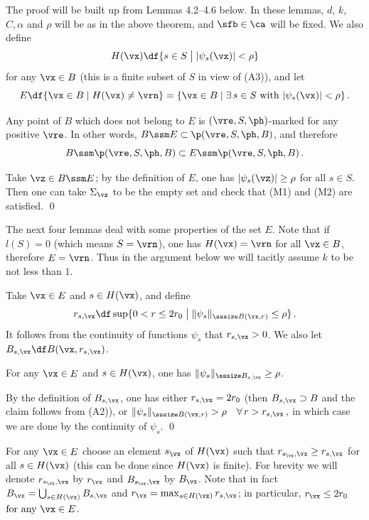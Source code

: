 The proof will be built up from Lemmas 4.2--4.6 below. In these lemmas,  $d$, $k$, $C,\alpha$ and $\rho$ will be as in the  above theorem, and   $\sfb\in\ca$ will be fixed. We also
 define 
$$
H(\vx)\df\{s\in S\bigm| |\psi_s(\vx)| < \rho \}
$$
for any  $\vx\in B$ (this is a finite subset of $S$ in view of (A3)), and let 
$$
E\df \{\vx\in B\mid H(\vx)\ne\vrn\} = \{\vx\in B\mid \exists\,s\in S\text{ with }|\psi_s(\vx)| < \rho \}\,.
$$


 Any point of $B$ which does not belong to $E$ is $(\vre,S,\ph)$-marked for any  positive $\vre$. In other words, 
$
B\ssm E \subset \p(\vre,S,\ph,B)
$, and therefore
$$
B\ssm \p(\vre,S,\ph,B)\subset E\ssm \p(\vre,S,\ph,B)\,.
$$
\endproclaim

 Take $\vz\in B\ssm E$; by the definition of $E$, one has $|\psi_s(\vz)| \ge \rho $ for all $s\in S$. Then one can take $\Sigma_\vz$ to be the empty set and check that (M1) and (M2) are satisfied. \qed\enddemo

The next four lemmas deal with some properties of the set $E$. Note that if $l(S)= 0$ (which means $S = \vrn$), one has $H(\vx)= \vrn$ for all $\vx\in B$, therefore $E = \vrn$. Thus in the argument below  we will tacitly assume $k$ to be not less than $1$. 

Take $\vx\in E$ and $s\in H(\vx)$, and define
$$
r_{s,\vx}\df\sup\{0< r \le 2r_0\bigm| \|\psi_s\|_{\sssize B(\vx,r)} \le \rho \}\,.
$$
 It follows from the continuity of functions $\psi_s$ that 
$r_{s,\vx} > 0$.  
We also  let 
$B_{s,\vx}\df B(\vx,r_{s,\vx})$.

   For any $\vx\in E$ and $s\in H(\vx)$, one has 
$\|\psi_s\|_{\sssize B_{s,\vx}} \ge \rho$.
\endproclaim

 By the definition of $B_{s,\vx}$, one has either $
r_{s,\vx} = 2r_0$ (then $B_{s,\vx}\supset B$ and the claim follows from (A2)), or 
$
\|\psi_s\|_{\sssize B(\vx,r)} > \rho  \quad\forall\,r > r_{s,\vx}\,,$ in which case  we are done by the continuity of $\psi_s$. 
\qed\enddemo

For any $\vx\in E$ choose an element $s_\vx$ of $ H(\vx)$ such that   $r_{s_\vx,\vx} \ge  
r_{s,\vx}$ for all $s\in H(\vx)$ (this can be done since $H(\vx)$ is finite). For brevity we will denote $r_{s_\vx,\vx}$ by $r_\vx$ and $B_{s_\vx,\vx}$ by $B_\vx$. Note that in fact $B_\vx = \bigcup_{s\in H(\vx)}B_{s,\vx}$ and $r_\vx = \max_{s\in H(\vx)}r_{s,\vx}$; in particular, 
$
r_\vx \le 2r_0$ $\text{for any }\vx\in E
$.

